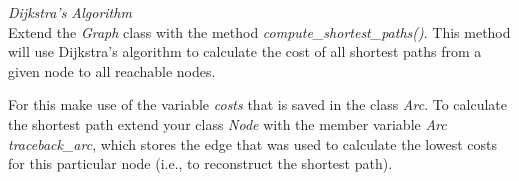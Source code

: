   \textit{Dijkstra's Algorithm}\\
Extend the \emph{Graph} class with the method \emph{compute\_shortest\_paths()}.
This method will use Dijkstra's algorithm to calculate the
cost of all shortest paths from a given node to all reachable nodes.

For this make use of the variable \emph{costs} that is saved in the class
\emph{Arc}. To calculate the shortest path extend your class \emph{Node} with the
member variable \emph{Arc traceback\_arc}, which stores the edge that was used to
calculate the lowest costs for this particular node (i.e., to reconstruct the shortest path).

